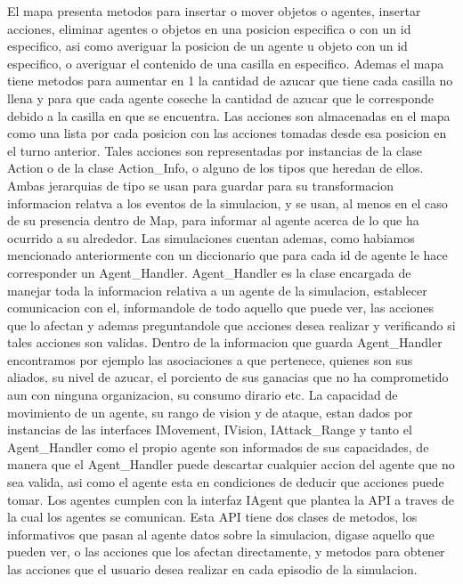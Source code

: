 \documentclass[11pt]{article}
\begin{document}
El mapa presenta metodos para insertar o mover objetos o agentes, insertar acciones, eliminar agentes o objetos en una posicion especifica o con un id especifico, asi como averiguar la posicion de un agente u objeto con un id especifico, o averiguar el contenido de una casilla en especifico. Ademas el mapa tiene metodos para aumentar en 1 la cantidad de azucar que tiene cada casilla no llena y para que cada agente coseche la cantidad de azucar que le corresponde debido a la casilla en que se encuentra.
Las acciones son almacenadas en el mapa como una lista por cada posicion con las acciones tomadas desde esa posicion en el turno anterior. Tales acciones son representadas por instancias de la clase Action o de la clase Action_Info, o alguno de los tipos que heredan de ellos. Ambas jerarquias de tipo se usan para guardar para su transformacion informacion relatva a los eventos de la simulacion, y se usan, al menos en el caso de su presencia dentro de Map, para informar al agente acerca de lo que ha ocurrido a su alrededor.
Las simulaciones cuentan ademas, como habiamos mencionado anteriormente con un diccionario que para cada id de agente le hace corresponder un Agent_Handler. Agent_Handler es la clase encargada de manejar toda la informacion relativa a un agente de la simulacion, establecer comunicacion con el, informandole de todo aquello que puede ver, las acciones que lo afectan y ademas preguntandole que acciones desea realizar y verificando si tales acciones son validas. Dentro de la informacion que guarda Agent_Handler encontramos por ejemplo las asociaciones a que pertenece, quienes son sus aliados, su nivel de azucar, el porciento de sus ganacias que no ha comprometido aun con ninguna organizacion, su consumo dirario etc.
La capacidad de movimiento de un agente, su rango de vision y de ataque, estan dados por instancias de las interfaces IMovement, IVision, IAttack_Range y tanto el Agent_Handler como el propio agente son informados de sus capacidades, de manera que el Agent_Handler puede descartar cualquier accion del agente que no sea valida, asi como el agente esta en condiciones de deducir que acciones puede tomar.
Los agentes cumplen con la interfaz IAgent que plantea la API a traves de la cual los agentes se comunican. Esta API tiene dos clases de metodos, los informativos que pasan al agente datos sobre la simulacion, digase aquello que pueden ver, o las acciones que los afectan directamente, y metodos para obtener las acciones que el usuario desea realizar en cada episodio de la simulacion.
\end{document}
